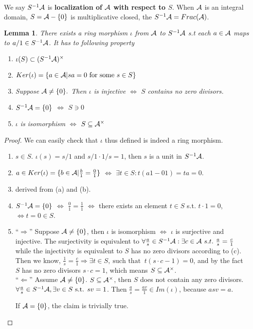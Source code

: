 \documentclass[11pt]{article}
\newtheorem{lemma}[thm]{Lemma}
\newcommand{\cala}{{\cal A}}
\newcommand{\Lrta}{\Longrightarrow}
\newcommand{\Llta}{\Longleftarrow}
\newcommand{\Llrta}{\Longleftrightarrow}
\begin{document}
We say $S^{-1}\cala$ is \textbf{localization of $\cala$ with respect to $S$}.
When $\cala$ is an integral domain, $S=\cala-\{0\}$ is multiplicative closed, the $S^{-1}\cala=Frac(\cala)$.
\begin{lemma}
There exists a ring morphism $\iota$ from $\cala$ to $S^{-1}\cala$ s.t each $a\in \cala$ maps to $a/1\in S^{-1}\cala$.
It has to following property
\begin{enumerate}[label=(\alph*)]
\item $\iota(S)\subset (S^{-1}\cala)^{\times}$
\item $Ker(\iota)=\{a\in \cala|sa=0 \text{ for some }s\in S\}$
\item Suppose $\cala\neq\{0\}.$ Then $\iota$ is injective $\Longleftrightarrow$ $S$ contains no zero divisors.
\item $S^{-1}\cala=\{0\}$ $\Longleftrightarrow$ $S\ni 0$
\item $\iota$ is isomorphism  $\Longleftrightarrow $ $S\subseteq \cala^{\times}$
\end{enumerate}
\end{lemma}
\begin{proof}We can easily check that $\iota$ thus defined is indeed a ring morphism.
\begin{enumerate}[label=(\alph*)]
\item  $s\in S$. $\iota(s)=s/1$ and $s/1\cdot 1/s=1$, then $s$ is a unit in $S^{-1}\cala$.
\item $a\in Ker(\iota)=\{b\in \cala|\frac{b}{1}=\frac{0}{1}\}$ $\Longleftrightarrow$ $\exists t\in S: t(a1-01)=ta=0.$
\item  derived from (a) and (b).
\item $S^{-1}\cala=\{0\}$ $\Longleftrightarrow$ $\frac{0}{1}=\frac{1}{1}$ $\Llrta$  there exists an element $t\in S$ s.t. $t\cdot1=0$, $\Longleftrightarrow t=0\in S$.
\item ``$\Lrta$'' Suppose $\cala\neq \{0\}$, then $\iota $ is isomorphism $\Llrta$  $\iota$ is surjective and injective. The surjectivity is equivalent to $\forall \frac{a}{s}\in S^{-1}\cala: \exists c\in \cala\ s.t.\ \frac{a}{s}=\frac{c}{1}$ while the injectivity is equivalent to $S$ has no zero divisors according to (c). Then we know, $\frac{1}{s}=\frac{c}{1}\Lrta\exists t\in S,\ \text{such that }\  t(s\cdot c-1)=0$, and by the fact $S$ has no zero divisors $s\cdot c=1$, which means $S\subseteq \cala^{\times}$.\\
``$\Llta$'' Assume $\cala\neq\{0\}$. $S\subseteq\cala^\times$, then $S$ does not contain any zero divisors. $\forall \frac{a}{s}\in S^{-1}\cala, \exists v\in S \text{ s.t. } sv=1$. Then $ \frac{a}{s}=\frac{av}{1}\in Im(\iota)$, because $a s v=a$.

If $\cala=\{0\}$, the claim is trivially true.
\end{enumerate}
\end{proof}
\end{document}
